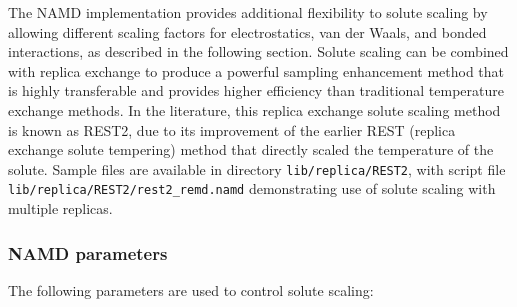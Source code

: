 The NAMD implementation provides additional flexibility to
solute scaling by allowing different scaling factors for electrostatics,
van der Waals, and bonded interactions, as described in the
following section.
Solute scaling can be combined with replica exchange
to produce a powerful sampling enhancement method
that is highly transferable and provides higher efficiency
than traditional temperature exchange methods.
In the literature, this replica exchange solute scaling method
is known as REST2, due to its improvement of the earlier
REST (replica exchange solute tempering) method
that directly scaled the temperature of the solute.
Sample files are available in directory {\tt lib/replica/REST2},
with script file {\tt lib/replica/REST2/rest2\_remd.namd}
demonstrating use of solute scaling with multiple replicas.

\subsubsection{NAMD parameters}

The following parameters are used to control solute scaling:

